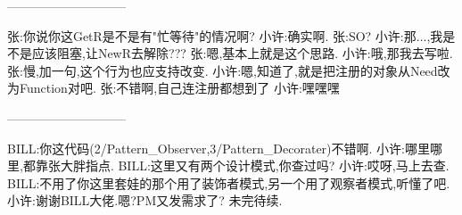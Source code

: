 \centerline{-----------------------------}\enter
张:你说你这GetR是不是有"忙等待"的情况啊?\enter
小许:确实啊.\enter
张:SO?\enter
小许:那...,我是不是应该阻塞,让NewR去解除???\enter
张:嗯,基本上就是这个思路.\enter
小许:哦,那我去写啦.\enter
张:慢,加一句,这个行为也应支持改变.\enter
小许:嗯,知道了,就是把注册的对象从Need改为Function对吧.\enter
张:不错啊,自己连注册都想到了\enter
小许:嘿嘿嘿\enter

\centerline{-----------------------------}\enter
BILL:你这代码(2/Pattern\_Observer,3/Pattern\_Decorater)不错啊.\enter
小许:哪里哪里,都靠张大胖指点.\enter
BILL:这里又有两个设计模式,你查过吗?\enter
小许:哎呀,马上去查.\enter
BILL:不用了你这里套娃的那个用了装饰者模式,另一个用了观察者模式,听懂了吧.\enter
小许:谢谢BILL大佬.嗯?PM又发需求了?\enter
\enter
未完待续.
